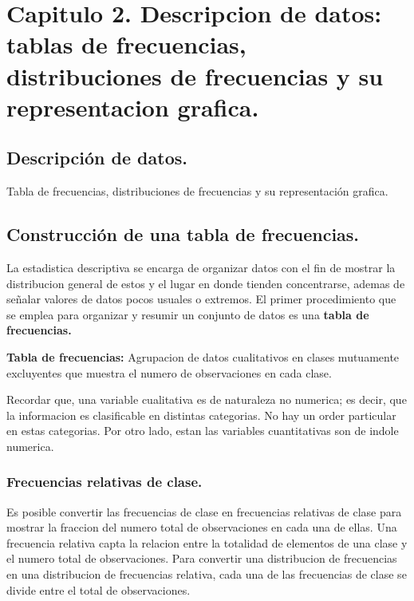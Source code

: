 \documentclass[]{article}
\begin{document}
\section{Capitulo 2. Descripcion de datos: tablas de frecuencias, distribuciones de frecuencias y su representacion grafica.}
\subsection{Descripción de datos.}
{\large Tabla de frecuencias, distribuciones de frecuencias y su representación grafica.}
\subsection{Construcción de una tabla de frecuencias.}
La estadistica descriptiva se encarga de organizar datos con el fin de mostrar la distribucion general de estos y el lugar en donde tienden concentrarse, ademas de señalar valores de datos pocos usuales o extremos. El primer procedimiento que se emplea para organizar y resumir un conjunto de datos es una \textbf{tabla de frecuencias.}
\begin{center}
	\textbf{Tabla de frecuencias:} Agrupacion de datos cualitativos en clases mutuamente excluyentes que muestra el numero de observaciones en cada clase.
\end{center}
Recordar que, una variable cualitativa es de naturaleza no numerica; es decir, que la informacion es clasificable en distintas categorias. No hay un order particular en estas categorias. Por otro lado, estan las variables cuantitativas son de indole numerica.
\subsubsection*{Frecuencias relativas de clase.}
Es posible convertir las frecuencias de clase en frecuencias relativas de clase para mostrar la fraccion del numero total de observaciones en cada una de ellas. Una frecuencia relativa capta la relacion entre la totalidad de elementos de una clase y el numero total de observaciones. Para convertir una distribucion de frecuencias en una distribucion de frecuencias relativa, cada una de las frecuencias de clase se divide entre el total de observaciones.
\end{document}
